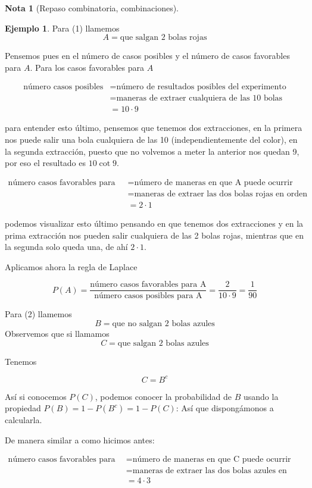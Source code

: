 \documentclass[]{book}
\theoremstyle{plain}
\theoremstyle{definition}
\newtheorem{note}[theorem]{Nota}
\newtheorem{example}[theorem]{Ejemplo}
\begin{document}
\begin{note}[Repaso combinatoria, combinaciones]
\begin{example}
  Para (1) llamemos
  \[A = \text{que salgan 2 bolas rojas}\]

  Pensemos pues en el número de casos posibles  y el número de casos favorables para $A$.
  Para los casos favorables para $A$ 
  
  \begin{align*}
    \text{número casos posibles} &= \text{número de resultados posibles del experimento}\\
    &=\text{maneras de extraer cualquiera de las 10 bolas }\\
    &= 10 \cdot 9
  \end{align*}

  para entender esto último, pensemos que tenemos dos extracciones, 
  en la primera nos puede salir una bola cualquiera de las 10 (independientemente del color), 
  en la segunda extracción, puesto
  que no volvemos a meter la anterior nos quedan 9, por eso el resultado es $10 \cot 9$.

  \begin{align*}
    \text{número casos favorables para A} &= \text{número de maneras en que A puede ocurrir}\\
    &=\text{maneras de extraer las dos bolas rojas en orden}\\
    &= 2 \cdot 1
  \end{align*}

  podemos visualizar esto último pensando en que tenemos dos extracciones y en la prima extracción nos pueden salir 
  cualquiera de las 2 bolas rojas, mientras que en la segunda solo queda una, de ahí $2\cdot 1$.

  Aplicamos ahora la regla de Laplace 

  \[P(A) = \frac{\text{número casos favorables para A}}{\text{número casos posibles para A}} = \frac{2}{10\cdot 9}=\frac{1}{90}\]


  Para (2) llamemos
  \[B = \text{que no salgan 2 bolas azules}\]
  Observemos que si llamamos 
  \[C = \text{que salgan 2 bolas azules} \]

  Tenemos 

  \[C= B^c\] 

  Así si conocemos $P(C)$, podemos conocer la probabilidad de $B$ usando la propiedad $P(B) = 1- P(B^c) = 1- P(C)$: Así que dispongámonos a calcularla.

  De manera similar a como hicimos antes:

  \begin{align*}
    \text{número casos favorables para C} &= \text{número de maneras en que C puede ocurrir}\\
    &=\text{maneras de extraer las dos bolas azules en orden}\\
    &= 4 \cdot 3
  \end{align*}


\end{example}
\end{note}
\end{document}
